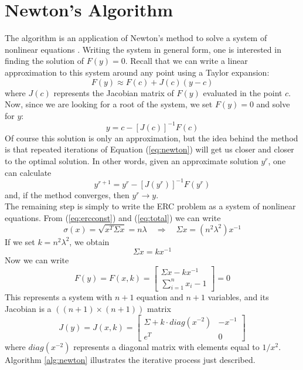 \section{Newton's Algorithm}
The algorithm is an application of Newton’s method to solve a system of nonlinear equations \cite{newton}. Writing the system in general form, one is interested in finding the solution of $F(y)=0$. Recall that we can write a linear approximation to this system around any point using a Taylor expansion:
\begin{equation}
F(y) \approx F(c) + J(c)(y-c)
\end{equation}
where $J(c)$ represents the Jacobian matrix of $F(y)$ evaluated in the point $c$. Now, since we are looking for a root of the system, we set $F(y) = 0$ and solve for $y$:
\begin{equation}\label{eq:newton}
y = c - [J(c)]^{-1}F(c)
\end{equation}
Of course this solution is only an approximation, but the idea behind the method is that repeated iterations of Equation (\ref{eq:newton}) will get us closer and closer to the optimal solution. In other words, given an approximate solution $y^{r}$, one can calculate
\begin{equation}
y^{r+1} = y^{r} - [J(y^{r})]^{-1}F(y^{r})
\end{equation}
and, if the method converges, then $y^{r}\rightarrow y$.\\
The remaining step is simply to write the ERC problem as a system of nonlinear equations. From (\ref{eq:ercconst}) and (\ref{eq:total}) we can write
\begin{equation}
\sigma(x) = \sqrt{x^T \Sigma x} = n\lambda \hspace{1em} \Rightarrow \hspace{1em} \Sigma x = (n^2\lambda^2)x^{-1}
\end{equation}
If we set $k=n^2\lambda^2$, we obtain
\begin{equation}
\Sigma x = k x^{-1}
\end{equation}
Now we can write
\begin{equation}
F(y) = F(x, k)= \begin{bmatrix}
    \Sigma x - kx^{-1}\\
    \sum_{i=1}^n x_i - 1
\end{bmatrix} = 0
\end{equation}
This represents a system with $n+1$ equation and $n+1$ variables, and its Jacobian is a $((n+1)\times(n+1))$ matrix
\begin{equation}
J(y) = J(x,k) = \begin{bmatrix}
    \Sigma + k\cdot diag(x^{-2}) & -x^{-1}\\
    e^T & 0
\end{bmatrix}
\end{equation}
where $diag(x^{-2})$ represents a diagonal matrix with elements equal to $1/x^2$. Algorithm \ref{alg:newton} illustrates the iterative process just described.

